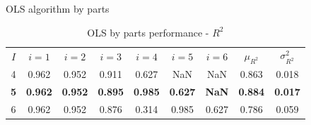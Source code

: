 \documentclass[english]{sobraep}
\begin{document}
\begin{algorithm}[!ht]
    \DontPrintSemicolon
      
        {
        }
    
    \caption{OLS algorithm by parts}
    \label{alg:OLS-by-parts}
\end{algorithm}

\begin{table}[H]
	\centering
	\caption{OLS by parts performance - \(R^2\)}
	\footnotesize
	\setlength{\tabcolsep}{5pt}
	\begin{tabular}{ccccccccc}
		\hline
		\multirow{2}{*}{\(I\)} & \multirow{2}{*}{\(i=1\)} & \multirow{2}{*}{\(i=2\)} & \multirow{2}{*}{\(i=3\)} & \multirow{2}{*}{\(i=4\)} & \multirow{2}{*}{\(i=5\)} & \multirow{2}{*}{\(i=6\)} & \multirow{2}{*}{\(\mu_{R^2}\)} & \multirow{2}{*}{\(\sigma_{R^2}^2\)} \\
		&  &  & \\		
		\hline
		4 & 0.962 & 0.952 & 0.911 & 0.627 & NaN & NaN & 0.863 & 0.018 \\
        \hline
		\textbf{5} &  \textbf{0.962}  & \textbf{0.952} & \textbf{0.895} & \textbf{0.985} & \textbf{0.627} & \textbf{NaN} & \textbf{0.884} & \textbf{0.017} \\
		\hline
		6 & 0.962 & 0.952 & 0.876 & 0.314 & 0.985 & 0.627 & 0.786 & 0.059 \\
		\hline
	\end{tabular} \label{tab:OLS-performance}
\end{table}
\end{document}
